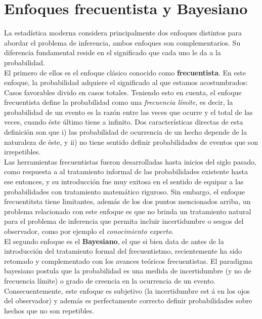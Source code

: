 \section{Enfoques frecuentista y Bayesiano}

La estadística moderna considera principalmente dos enfoques distintos para abordar el problema de inferencia, ambos enfoques son complementarios. Su diferencia fundamental reside en el significado que cada uno le da a la probabilidad.\\

El primero de ellos es el enfoque clásico conocido como \textbf{frecuentista}. En este enfoque, la probabilidad adquiere el significado al que estamos acostumbrados: Casos favorables divido en casos totales. Teniendo esto en cuenta, el enfoque frecuentista define la probabilidad como una \emph{frecuencia límite}, es decir, la probabilidad de un evento es la razón entre las veces que ocurre y el total de las veces, cuando éste último tiene a infinito. Dos características directas de esta definición son que i) las probabilidad de ocurrencia de un hecho depende de la naturaleza de éste, y ii) no tiene sentido definir probabilidades de eventos que son irrepetibles.\\

Las herramientas frecuentistas fueron desarrolladas hasta inicios del siglo pasado, como respuesta a al tratamiento informal de las probabilidades existente hasta ese entonces, y su introducción fue muy exitosa en el sentido de equipar a las probabilidades con tratamiento matemático riguroso. Sin embargo, el enfoque frecuentitsta tiene limitantes, además de los dos puntos mencionados arriba, un problema relacionado con este enfoque es que no brinda un tratamiento natural para el problema de inferencia que permita incluir incertidumbre o sesgos del observador, como por ejemplo el  \emph{conocimiento experto}.\\

El segundo enfoque es el \textbf{Bayesiano}, el que si bien data de antes de la introducción del tratamiento formal del frecuentistmo, recientemente ha sido retomado y complementado con los avances teóricos frecuentistas. El paradigma bayesiano postula que la probabilidad es una medida de incertidumbre (y no de frecuencia límite) o grado de creencia en la ocurrencia de un evento. Consecuentemente, este enfoque es subjetivo (la incertidumbre est
á en los ojos del observador) y además es perfectamente correcto definir probabilidades sobre hechos que no son repetibles. \\

